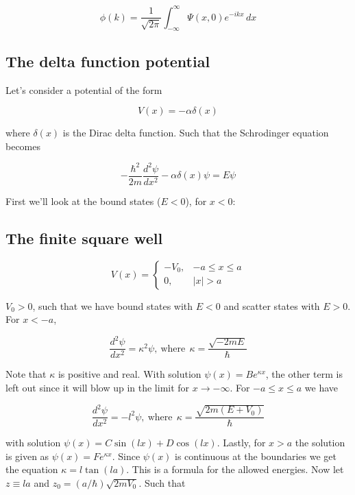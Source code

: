 \documentclass[a4paper]{article}
\begin{document}
\begin{equation}
	\phi(k)=\frac{1}{\sqrt{2\pi}}\int_{-\infty}^{\infty}\Psi(x,0)e^{-ikx}\,dx
\end{equation}

\subsection{The delta function potential}

Let's consider a potential of the form 

\begin{equation}
	V(x)=-\alpha\delta(x)
\end{equation}

where $\delta(x)$ is the Dirac delta function. Such that the Schrodinger equation becomes

\begin{equation}
	-\frac{\hbar^2}{2m}\frac{d^2\psi}{dx^2}-\alpha\delta(x)\psi=E\psi
\end{equation}

First we'll look at the bound states ($E<0$), for $x<0$:

\subsection{The finite square well}

\[V(x) = \left\{
\begin{array}{lr}
-V_0, &-a \le x \le a\\
0, &|x|>a
\end{array}
\right.
\]

$V_0>0$, such that we have bound states with $E<0$ and scatter states with $E>0$. For $x<-a$, 

\begin{equation}
	\frac{d^2\psi}{dx^2}=\kappa^2\psi, \ \text{where}\ \ \kappa=\frac{\sqrt{-2mE}}{\hbar}
\end{equation}

Note that $\kappa$ is positive and real. With solution $\psi(x)=Be^{\kappa x}$, the other term is left out since it will blow up in the limit for $x\rightarrow -\infty$. For $-a\le x\le a$ we have


\begin{equation}
\frac{d^2\psi}{dx^2}=-l^2\psi, \ \text{where}\ \ \kappa=\frac{\sqrt{2m(E+V_0)}}{\hbar}
\end{equation}

with solution $\psi(x)=C\sin(lx)+D\cos(lx)$. Lastly, for $x>a$ the solution is given as $\psi(x)=Fe^{\kappa x}$. Since $\psi(x)$ is continuous at the boundaries we get the equation $\kappa=l\tan(la)$. This is a formula for the allowed energies. Now let $z\equiv la$ and $z_0=(a/\hbar )\sqrt{2mV_0}$. Such that 
\end{document}
